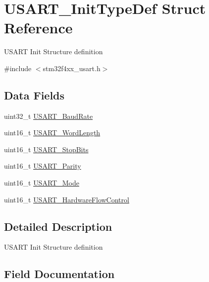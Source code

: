 \hypertarget{struct_u_s_a_r_t___init_type_def}{}\section{U\+S\+A\+R\+T\+\_\+\+Init\+Type\+Def Struct Reference}
\label{struct_u_s_a_r_t___init_type_def}


U\+S\+A\+RT Init Structure definition ~\newline
  




{\ttfamily \#include $<$stm32f4xx\+\_\+usart.\+h$>$}

\subsection*{Data Fields}
\begin{DoxyCompactItemize}
\item 
uint32\+\_\+t \mbox{\hyperlink{struct_u_s_a_r_t___init_type_def_a8712e31ee9d088d83c84d38d88c6af0b}{U\+S\+A\+R\+T\+\_\+\+Baud\+Rate}}
\item 
uint16\+\_\+t \mbox{\hyperlink{struct_u_s_a_r_t___init_type_def_aa1248b67914e095c0de768223eea9328}{U\+S\+A\+R\+T\+\_\+\+Word\+Length}}
\item 
uint16\+\_\+t \mbox{\hyperlink{struct_u_s_a_r_t___init_type_def_aa58409990a6a0bc99f432eb90e204c0f}{U\+S\+A\+R\+T\+\_\+\+Stop\+Bits}}
\item 
uint16\+\_\+t \mbox{\hyperlink{struct_u_s_a_r_t___init_type_def_a4edcc84644c8553a1a6e841c48ea8413}{U\+S\+A\+R\+T\+\_\+\+Parity}}
\item 
uint16\+\_\+t \mbox{\hyperlink{struct_u_s_a_r_t___init_type_def_a1a581f24451bf5a4a210bab8d68998e2}{U\+S\+A\+R\+T\+\_\+\+Mode}}
\item 
uint16\+\_\+t \mbox{\hyperlink{struct_u_s_a_r_t___init_type_def_ab41fe3b9f5cb4ed89be23bff0a1f4114}{U\+S\+A\+R\+T\+\_\+\+Hardware\+Flow\+Control}}
\end{DoxyCompactItemize}


\subsection{Detailed Description}
U\+S\+A\+RT Init Structure definition ~\newline
 

\subsection{Field Documentation}
\mbox{\label{struct_u_s_a_r_t___init_type_def_a8712e31ee9d088d83c84d38d88c6af0b}} 
